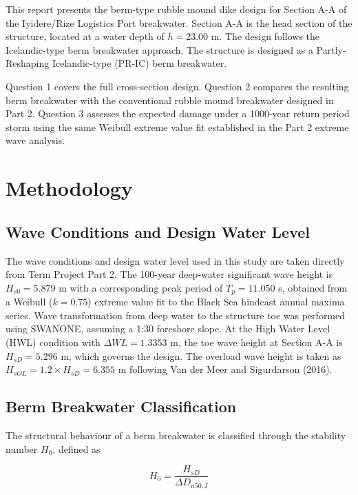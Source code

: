 \documentclass[a4paper, 11pt]{article}
\begin{document}
\hspace*{0.5cm}This report presents the berm-type rubble mound dike design for Section A-A of the Iyidere/Rize Logistics Port breakwater. Section A-A is the head section of the structure, located at a water depth of $h = 23.00$ m. The design follows the Icelandic-type berm breakwater approach. The structure is designed as a Partly-Reshaping Icelandic-type (PR-IC) berm breakwater.

Question 1 covers the full cross-section design. Question 2 compares the resulting berm breakwater with the conventional rubble mound breakwater designed in Part 2. Question 3 assesses the expected damage under a 1000-year return period storm using the same Weibull extreme value fit established in the Part 2 extreme wave analysis.

\section{Methodology}
\subsection{Wave Conditions and Design Water Level}
\hspace{0.5cm}The wave conditions and design water level used in this study are taken directly from Term Project Part 2. The 100-year deep-water significant wave height is $H_{s0} = 5.879$ m with a corresponding peak period of $T_p = 11.050$ s, obtained from a Weibull ($k = 0.75$) extreme value fit to the Black Sea hindcast annual maxima series. Wave transformation from deep water to the structure toe was performed using SWANONE, assuming a 1:30 foreshore slope. At the High Water Level (HWL) condition with $\Delta WL = 1.3353$ m, the toe wave height at Section A-A is $H_{sD} = 5.296$ m, which governs the design. The overload wave height is taken as $H_{sOL} = 1.2 \times H_{sD} = 6.355$ m following Van der Meer and Sigurdarson (2016).


\subsection{Berm Breakwater Classification}
\hspace{0.5cm}The structural behaviour of a berm breakwater is classified through the stability number $H_0$, defined as

\begin{equation}
    H_0 = \frac{H_{sD}}{\Delta D_{n50,I}}
    \label{eq:stability_number}
\end{equation}
\end{document}

